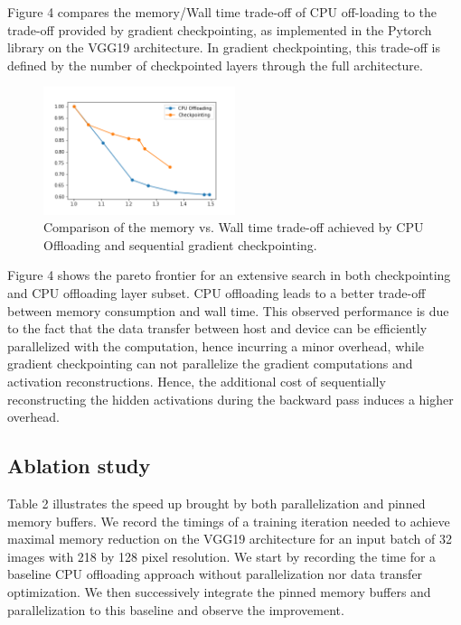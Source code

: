 \documentclass[11pt,onecolumn]{article}
\begin{document}
Figure 4 compares the memory/Wall time trade-off of CPU off-loading
to the trade-off provided by gradient checkpointing,
as implemented in the Pytorch \cite{paszke2017automatic} library on the VGG19 architecture.
In gradient checkpointing, this trade-off is defined by the
number of checkpointed layers through the full architecture.

\begin{figure}[h!]
\centering
\includegraphics[width=0.5\textwidth]{Figure4.png}
\caption{Comparison of the memory vs. Wall time trade-off achieved by CPU Offloading and sequential gradient checkpointing.}
\end{figure}

Figure 4 shows the pareto frontier for an extensive search
in both checkpointing and CPU offloading layer subset.
CPU offloading leads to a better trade-off between memory consumption and wall time.
This observed performance is due to the fact that the data transfer between host and device
can be efficiently parallelized with the computation, hence incurring a minor overhead,
while gradient checkpointing can not parallelize the gradient computations and activation reconstructions.
Hence, the additional cost of sequentially reconstructing the hidden activations 
during the backward pass induces a higher overhead.

\subsection{Ablation study}

Table 2 illustrates the speed up brought by both parallelization and pinned memory buffers.
We record the timings of a training iteration needed to achieve maximal 
memory reduction on the VGG19 architecture for an input batch of 32 images with 218 by 128 pixel resolution.
We start by recording the time for a baseline CPU offloading approach without parallelization 
nor data transfer optimization.
We then successively integrate the pinned memory buffers and parallelization to this baseline 
and observe the improvement.
\end{document}
